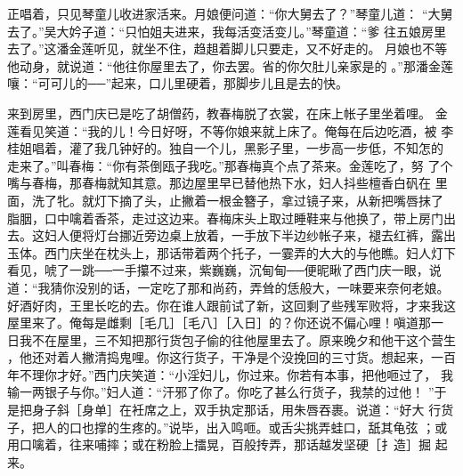 正唱着，只见琴童儿收进家活来。月娘便问道：“你大舅去了？”琴童儿道：
“大舅去了。”吴大妗子道：“只怕姐夫进来，我每活变活变儿。”琴童道：“爹
往五娘房里去了。”这潘金莲听见，就坐不住，趋趄着脚儿只要走，又不好走的。
月娘也不等他动身，就说道：“他往你屋里去了，你去罢。省的你欠肚儿亲家是的
。”那潘金莲嚷：“可可儿的──”起来，口儿里硬着，那脚步儿且是去的快。

来到房里，西门庆已是吃了胡僧药，教春梅脱了衣裳，在床上帐子里坐着哩。
金莲看见笑道：“我的儿！今日好呀，不等你娘来就上床了。俺每在后边吃酒，被
李桂姐唱着，灌了我几钟好的。独自一个儿，黑影子里，一步高一步低，不知怎的
走来了。”叫春梅：“你有茶倒瓯子我吃。”那春梅真个点了茶来。金莲吃了，努
了个嘴与春梅，那春梅就知其意。那边屋里早已替他热下水，妇人抖些檀香白矾在
里面，洗了牝。就灯下摘了头，止撇着一根金簪子，拿过镜子来，从新把嘴唇抹了
脂胭，口中噙着香茶，走过这边来。春梅床头上取过睡鞋来与他换了，带上房门出
去。这妇人便将灯台挪近旁边桌上放着，一手放下半边纱帐子来，褪去红裤，露出
玉体。西门庆坐在枕头上，那话带着两个托子，一霎弄的大大的与他瞧。妇人灯下
看见，唬了一跳──一手攥不过来，紫巍巍，沉甸甸──便昵瞅了西门庆一眼，说
道：“我猜你没别的话，一定吃了那和尚药，弄耸的恁般大，一味要来奈何老娘。
好酒好肉，王里长吃的去。你在谁人跟前试了新，这回剩了些残军败将，才来我这
屋里来了。俺每是雌剩［毛几］［毛八］［入日］的？你还说不偏心哩！嗔道那一
日我不在屋里，三不知把那行货包子偷的往他屋里去了。原来晚夕和他干这个营生
，他还对着人撇清捣鬼哩。你这行货子，干净是个没挽回的三寸货。想起来，一百
年不理你才好。”西门庆笑道：“小淫妇儿，你过来。你若有本事，把他咂过了，
我输一两银子与你。”妇人道：“汗邪了你了。你吃了甚么行货子，我禁的过他！
”于是把身子斜［身单］在衽席之上，双手执定那话，用朱唇吞裹。说道：“好大
行货子，把人的口也撑的生疼的。”说毕，出入鸣咂。或舌尖挑弄蛙口，舐其龟弦
；或用口噙着，往来哺摔；或在粉脸上擂晃，百般抟弄，那话越发坚硬［扌造］掘
起来。

